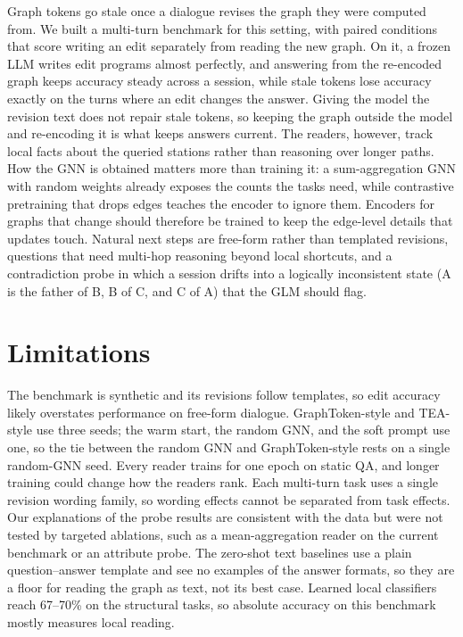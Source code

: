 \documentclass[11pt]{article}
\begin{document}
Graph tokens go stale once a dialogue revises the graph they were computed from.
We built a multi-turn benchmark for this setting, with paired conditions that score writing an edit separately from reading the new graph.
On it, a frozen LLM writes edit programs almost perfectly, and answering from the re-encoded graph keeps accuracy steady across a session, while stale tokens lose accuracy exactly on the turns where an edit changes the answer.
Giving the model the revision text does not repair stale tokens, so keeping the graph outside the model and re-encoding it is what keeps answers current.
The readers, however, track local facts about the queried stations rather than reasoning over longer paths.
How the GNN is obtained matters more than training it: a sum-aggregation GNN with random weights already exposes the counts the tasks need, while contrastive pretraining that drops edges teaches the encoder to ignore them.
Encoders for graphs that change should therefore be trained to keep the edge-level details that updates touch.
Natural next steps are free-form rather than templated revisions, questions that need multi-hop reasoning beyond local shortcuts, and a contradiction probe in which a session drifts into a logically inconsistent state (A is the father of B, B of C, and C of A) that the GLM should flag.

\section*{Limitations}

The benchmark is synthetic and its revisions follow templates, so edit accuracy likely overstates performance on free-form dialogue.
GraphToken-style and TEA-style use three seeds; the warm start, the random GNN, and the soft prompt use one, so the tie between the random GNN and GraphToken-style rests on a single random-GNN seed.
Every reader trains for one epoch on static QA, and longer training could change how the readers rank.
Each multi-turn task uses a single revision wording family, so wording effects cannot be separated from task effects.
Our explanations of the probe results are consistent with the data but were not tested by targeted ablations, such as a mean-aggregation reader on the current benchmark or an attribute probe.
The zero-shot text baselines use a plain question--answer template and see no examples of the answer formats, so they are a floor for reading the graph as text, not its best case.
Learned local classifiers reach 67--70\% on the structural tasks, so absolute accuracy on this benchmark mostly measures local reading.
\end{document}
